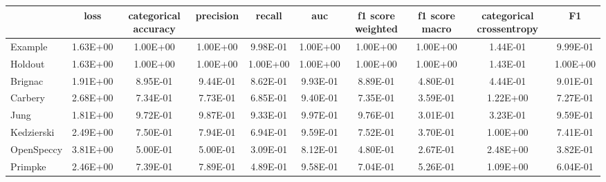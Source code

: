 \begin{tabular}{lccccccccc}
\toprule
 & loss & categorical accuracy & precision & recall & auc & f1 score weighted & f1 score macro & categorical crossentropy & F1 \\
\midrule
Example & 1.63E+00 & 1.00E+00 & 1.00E+00 & 9.98E-01 & 1.00E+00 & 1.00E+00 & 1.00E+00 & 1.44E-01 & 9.99E-01 \\
Holdout & 1.63E+00 & 1.00E+00 & 1.00E+00 & 1.00E+00 & 1.00E+00 & 1.00E+00 & 1.00E+00 & 1.43E-01 & 1.00E+00 \\
Brignac & 1.91E+00 & 8.95E-01 & 9.44E-01 & 8.62E-01 & 9.93E-01 & 8.89E-01 & 4.80E-01 & 4.44E-01 & 9.01E-01 \\
Carbery & 2.68E+00 & 7.34E-01 & 7.73E-01 & 6.85E-01 & 9.40E-01 & 7.35E-01 & 3.59E-01 & 1.22E+00 & 7.27E-01 \\
Jung & 1.81E+00 & 9.72E-01 & 9.87E-01 & 9.33E-01 & 9.97E-01 & 9.76E-01 & 3.01E-01 & 3.23E-01 & 9.59E-01 \\
Kedzierski & 2.49E+00 & 7.50E-01 & 7.94E-01 & 6.94E-01 & 9.59E-01 & 7.52E-01 & 3.70E-01 & 1.00E+00 & 7.41E-01 \\
OpenSpeccy & 3.81E+00 & 5.00E-01 & 5.00E-01 & 3.09E-01 & 8.12E-01 & 4.80E-01 & 2.67E-01 & 2.48E+00 & 3.82E-01 \\
Primpke & 2.46E+00 & 7.39E-01 & 7.89E-01 & 4.89E-01 & 9.58E-01 & 7.04E-01 & 5.26E-01 & 1.09E+00 & 6.04E-01 \\
\bottomrule
\end{tabular}
